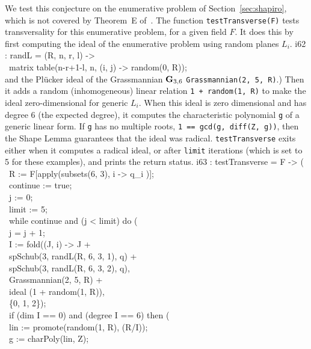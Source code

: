 We test this conjecture on the enumerative problem of 
Section~\ref{sec:shapiro}, which is not covered by 
Theorem~E of~\cite{SO:So97a}.
The function {\tt testTransverse(F)} tests transversality
for this enumerative problem, for a given field $F$. 
It does this by first computing the ideal of the enumerative problem using 
random planes $L_i$.
%
\beginOutput
i62 : randL = (R, n, r, l) -> \\
\                matrix table(n-r+1-l, n, (i, j) -> random(0, R));\\
\endOutput
%
and the Pl\"ucker ideal of the Grassmannian ${\bf G}_{3,6}$
 {\tt Grassmannian(2, 5, R)}.)
Then it adds a random (inhomogeneous) linear relation 
 {\tt 1 + random(1, R)} to make the ideal zero-dimensional for generic $L_i$. 
When this ideal is zero dimensional and has degree 6 (the expected degree), it
computes the characteristic polynomial {\tt g} of a generic linear form.
If {\tt g} has no multiple roots, {\tt 1 == gcd(g, diff(Z, g))}, 
then the Shape Lemma
guarantees that the ideal was radical.
{\tt testTransverse} exits either when it computes a radical ideal,
or after {\tt limit} iterations (which is set to 5 for these examples), and
prints the return status. 
%
\beginOutput
i63 : testTransverse = F -> (\\
\            R := F[apply(subsets(6, 3), i -> q_i )];\\
\            continue := true;\\
\            j := 0;  \\
\            limit := 5;\\
\            while continue and (j < limit) do (\\
\                 j = j + 1;\\
\                 I := fold((J, i) -> J + \\
\                           spSchub(3, randL(R, 6, 3, 1), q) +\\
\                           spSchub(3, randL(R, 6, 3, 2), q),\\
\                           Grassmannian(2, 5, R) + \\
\                           ideal (1 + random(1, R)),\\
\                           \{0, 1, 2\});\\
\                 if (dim I == 0) and (degree I == 6) then (\\
\                 lin := promote(random(1, R), (R/I));\\
\                 g := charPoly(lin, Z);\\
